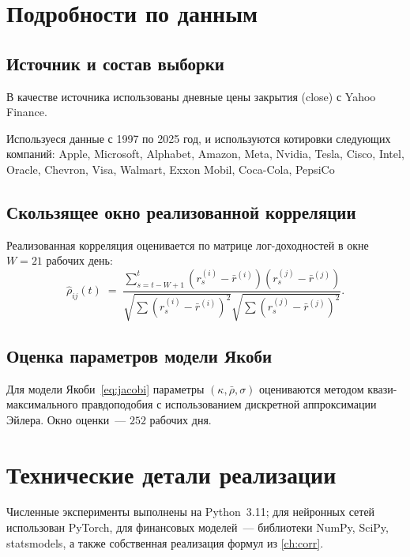 \chapter{Подробности по данным}
\label{app:data-details}

\section*{Источник и состав выборки}

В качестве источника использованы дневные цены закрытия (close) с
Yahoo Finance.

Используеся данные с 1997 по 2025 год, и используются котировки следующих компаний:
Apple,
Microsoft,
Alphabet,
Amazon,
Meta,
Nvidia,
Tesla,
Cisco,
Intel,
Oracle,
Chevron,
Visa,
Walmart,
Exxon Mobil,
Coca-Cola,
PepsiCo

\section*{Скользящее окно реализованной корреляции}

Реализованная корреляция оценивается по матрице лог-доходностей в окне
$W = 21$ рабочих день:
\begin{equation}
  \hat\rho_{ij}(t)
  \;=\;
  \frac{\sum_{s=t-W+1}^{t}(r^{(i)}_s-\bar r^{(i)})(r^{(j)}_s-\bar r^{(j)})}
       {\sqrt{\sum (r^{(i)}_s-\bar r^{(i)})^{2}}\sqrt{\sum (r^{(j)}_s-\bar r^{(j)})^{2}}}.
\end{equation}

\section*{Оценка параметров модели Якоби}

Для модели Якоби~\eqref{eq:jacobi} параметры $(\kappa,\bar\rho,\sigma)$
оцениваются методом квази-максимального правдоподобия с использованием
дискретной аппроксимации Эйлера. Окно оценки~--- $252$ рабочих дня.

\chapter{Технические детали реализации}
\label{app:code}

Численные эксперименты выполнены на Python~3.11; для нейронных сетей
использован PyTorch, для финансовых моделей~--- библиотеки NumPy,
SciPy, statsmodels, а также собственная реализация формул из
\cref{ch:corr}.

